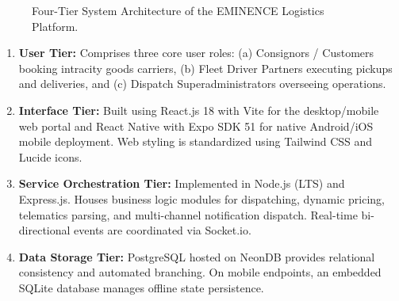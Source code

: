 \documentclass[conference]{IEEEtran}
\begin{document}
\begin{figure}[htbp]
\centering
{}
\caption{Four-Tier System Architecture of the EMINENCE Logistics Platform.}
\label{fig:architecture}
\end{figure}

\begin{enumerate}
    \item \textbf{User Tier:} Comprises three core user roles: (a) Consignors / Customers booking intracity goods carriers, (b) Fleet Driver Partners executing pickups and deliveries, and (c) Dispatch Superadministrators overseeing operations.
    \item \textbf{Interface Tier:} Built using React.js 18 with Vite for the desktop/mobile web portal and React Native with Expo SDK 51 for native Android/iOS mobile deployment. Web styling is standardized using Tailwind CSS and Lucide icons.
    \item \textbf{Service Orchestration Tier:} Implemented in Node.js (LTS) and Express.js. Houses business logic modules for dispatching, dynamic pricing, telematics parsing, and multi-channel notification dispatch. Real-time bi-directional events are coordinated via Socket.io.
    \item \textbf{Data Storage Tier:} PostgreSQL hosted on NeonDB provides relational consistency and automated branching. On mobile endpoints, an embedded SQLite database manages offline state persistence.
\end{enumerate}
\end{document}
